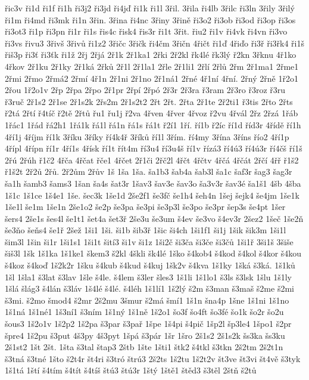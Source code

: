 řic3v
ři1d
ři1f
ři1h
ři3j2
ři3jd
ři4jď
ři1k
ři1l
3řil.
3řila
ři4lb
3řilc
ři3ln
3řily
3řilý
ři1m
ři4md
ři3mk
ři1n
3řin.
3řina
ři4nc
3řiny
3řině
ři3o2
ři3ob
ři3od
ři3op
ři3os
ři3ot3
ři1p
ři3pn
ři1r
ři1s
řis4c
řisk4
řis3r
ři1t
3řit.
řiu2
ři1v
ři4vk
ři4vn
ři3vo
ři3vs
řivu3
3řivš
3řivů
ři1z2
3řičc
3řičk
ři4čm
3řičn
4řičt
ři1ď
4řiďo
ři3ř
ři3řk4
ři1š
řiš3p
ři3ť
ři3ťk
ři1ž
2řj
2řjá
2ř1k
2ř1ka1
2řki
2ř2kl
řk4lé
řk3lý
ř2kn
3řknu
4ř1ko
4řkov
2ř1ku
2ř1ky
2ř1ká
2řků
2ř1l
2ř1la1
2řle
2ř1li1
2řlí
2řlů
2řm
2ř1ma1
2řme1
2řmi
2řmo
2řmá2
2řmí
4ř1n
2ř1ni
2ř1no
2ř1ná1
2řné
4ř1ní
4řní.
2řný
2řně
1ř2o1
2řou
1ř2o1v
2řp
2řpa
2řpo
2ř1pr
2řpí
2řpó
2ř3r
2ř3ra
ř3ram
2ř3ro
ř3roz
ř3ru
ř3ruč
2ř1s2
2ř1se
2ř1s2k
2řs2m
2ř1s2t2
2řt
2řt.
2řta
2ř1te
2ř2ti1
ř3tis
2řto
2řts
ř2tá
2řtí
ř4tíč
ř2tě
2řtů
řu1
řu1j
ř2va
4řven
4řver
4řvoz
ř2vu
4řvál
2řz
2řzá
1řáb
1řác1
1řád
řá2h1
1řá1k
řá1l
řá1n
řá1s
řá1t
ř2í1
1ří.
ří1b
ř2íc
ří1d
říd3r
4řídě
ří1h
4ří1j
4říjm
ří1k
3říku
3říky
ří4k4ř
3říků
ří1l
3řím.
ří4my
3řína
3říns
řío2
4ří1p
4řípl
4řípn
ří1r
4ří1s
4řísk
ří1t
řít4m
ří3u4
ří3u4š
ří1v
řízá3
ří4ú3
ří4ú3r
ří4čš
ří1š
2řú
2řúh
ř1č2
4řča
4řčat
řče1
4řčet
2ř1či
2řč2l
4řčt
4řčtv
4řčá
4řčát
2řčí
4řř
ř1š2
ř1š2t
2ř2ů
2řů.
2ř2ům
2řův
1š
1ša
1ša.
ša1b3
šab4a
šab3l
ša1c
šaf3r
šag3
šag3r
ša1h
šamb3
šams3
1šan
ša4s
šat3r
1šav3
šav3e
šav3o
ša3v3r
šav3é
ša1š1
4šb
4šba
1š1c
1š1ce
1š4e1
1še.
šec3k
1še1d
2še2f1
še3fč
še1h4
šeh4n
1šej
šejk4
še4jm
1še1k
1še1l
še1m
1še1n
2še1o2
še2p
še3pa
še3pi
še3p3l
še3po
še3pr
šep3s
še4pt
1šer
šers4
2še1s
šes4l
še1t1
šet4a
šet3ř
2še3u
še3um
š4ev
še3vo
š4ev3r
2šez2
1šeč
1še2ň
še3ňo
šeňs4
še1ř
2šež
1ši1
1ši.
ši1b
šib3ř
1šic
ši4ch
1ši1f1
ši1j
1šik
šik3m
1ši1l
šim3l
1šin
ši1r
1ši1s1
1ši1t
šití3
ši1v
ši1z
1ši2č
ši3ča
ši3če
ši3čů
1ši1ř
3ši1š
3šiše
šiš3l
1šk
1š1ka
1š1ke1
škem3
š2kl
4škli
šk4lé
1ško
š4kob4
š4kod
š4kol
š4kor
š4kou
š4koz
š4koď
1š2k2r
1šku
š4kub
š4kud
š4kuj
1šk2v
š4kva
1š1ky
1šká
š3ká.
1š1ků
1šl
1šla1
š3lat
š3lav
1šle
š4le.
š4lem
š3ler
šles3
1š1li
1š1lo1
š3ls
š3lsk
1šlu
1š1ly
1šlá
šlág3
š4lán
š3láv
1š4lé
š4lé.
š4léh
1š1lí1
1š2lý
š2m
š3man
š3maš
š2me
š2mi
š3mi.
š2mo
šmod4
š2mr
2š2mu
3šmur
š2má
šmí1
1š1n
šna4p
1šne
1š1ni
1š1no
1š1ná
1š1né1
1š3ní1
š3ním
1š1ný
1š1ně
1š2o1
šo3f
šo4ft
šo3fé
šo1k
šo2r
šo2u
šous3
1š2o1v
1š2p2
1š2pa
š3par
š3pař
1špe
1š4pi
š4pič
1šp2l
šp3le4
1špo1
š2pr
špre4
1š2pu
š3put
4š3py
4š3pyt
1špá
š3pár
1šr
1šro
2š1s2
2š1s2k
šs3ka
šs3ku
2š1st2
1št
2št.
1šta
š3tal
štap3
2štb
1šte
1šti1
štk2
š4tkl
š3tkn
2š2tm
2š2t1n
š3tná
š3tné
1što
š2t4r
št4ri
š3tró
štrú3
2š2ts
1š2tu
1š2t2v
št3ve
št3vi
št4vě
š3tyk
1š1tá
1ští
š4tím
š4tít
š4tíš
štú3
štú3r
1štý
1ště1
štěd3
š3těl
2štň
š2tů

